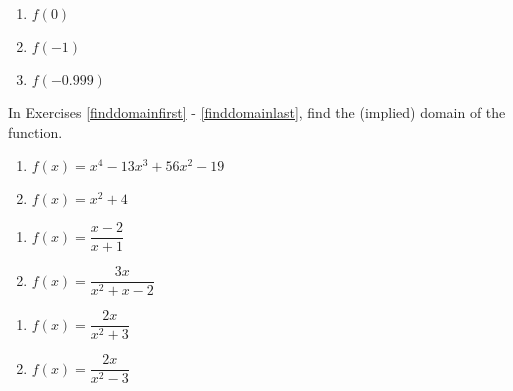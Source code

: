 \begin{enumerate}
\begin{multicols}{3}
\begin{enumerate}
\setcounter{HWindent}{\value{enumii}}
\end{enumerate}
\end{multicols}

\begin{multicols}{3}
\begin{enumerate}
\setcounter{enumii}{\value{HWindent}}

\item $f(0)$
\item $f(-1)$
\item $f(-0.999)$

\setcounter{HWindent}{\value{enumii}}
\end{enumerate}
\end{multicols}

\setcounter{HW}{\value{enumi}}
\end{enumerate}

In Exercises \ref{finddomainfirst} - \ref{finddomainlast}, find the (implied) domain of the function.

\begin{multicols}{2}
\begin{enumerate}
\setcounter{enumi}{\value{HW}}

\item $f(x) = x^{4} - 13x^{3} + 56x^{2} - 19$ \label{finddomainfirst}
\item  $f(x) = x^2 + 4$

\setcounter{HW}{\value{enumi}}
\end{enumerate}
\end{multicols}

\begin{multicols}{2}
\begin{enumerate}
\setcounter{enumi}{\value{HW}}

\item $f(x) = \dfrac{x-2}{x+1}$
\item  $f(x) = \dfrac{3x}{x^2+x-2}$

\setcounter{HW}{\value{enumi}}
\end{enumerate}
\end{multicols}

\begin{multicols}{2}
\begin{enumerate}
\setcounter{enumi}{\value{HW}}

\item $f(x) = \dfrac{2x}{x^2+3}$
\item  $f(x) = \dfrac{2x}{x^2-3}$

\setcounter{HW}{\value{enumi}}
\end{enumerate}
\end{multicols}

